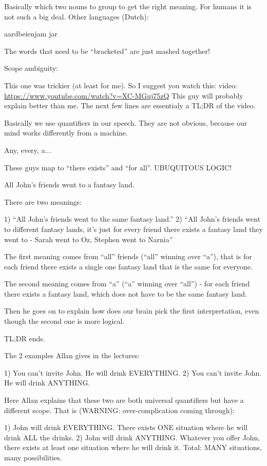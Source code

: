 Basically which two nouns to group to get the right meaning. For humans it is
not such a big deal. Other languages (Dutch):

aardbeienjam jar

The words that need to be ``bracketed'' are just mashed together!

Scope ambiguity:

This one was trickier (at least for me). So I suggest you watch this: video:
\url{https://www.youtube.com/watch?v=XC-MGuj75zQ} This guy will probably explain
better than me. The next few lines are essentialy a TL;DR of the video.

Basically we use quantifiers in our speech. They are not obvious, because our
mind works differently from a machine.

Any, every, a...

These guys map to ``there exists'' and ``for all''. UBUQUITOUS LOGIC!

All John's friends went to a fantasy land.

There are two meanings:

1) ``All John's friends went to the same fantasy land.''
2) ``All John's friends went to different fantasy lands, it's just for every friend there exists a fantasy land they went to - Sarah went to Oz, Stephen went to Narnia''

The first meaning comes from ``all'' friends (``all'' winning over ``a''), that
is for each friend there exists a single one fantasy land that is the same for
everyone.

The second meaning comes from ``a'' (``a'' winning over ``all'') - for each
friend there exists a fantasy land, which does not have to be the same fantasy
land.

Then he goes on to explain how does our brain pick the first interpretation,
even though the second one is more logical.

TL;DR ends.

The 2 examples Allan gives in the lectures:

1) You can't invite John. He will drink EVERYTHING.
2) You can't invite John. He will drink ANYTHING.

Here Allan explains that these two are both universal quantifiers but have a
different scope. That is (WARNING: over-complication coming through):

1) John will drink EVERYTHING.
There exists ONE situation where he will drink ALL the drinks.
2) John will drink ANYTHING.
Whatever you offer John, there exists at least one situation where he will drink
it. Total: MANY situations, many possibilities.


